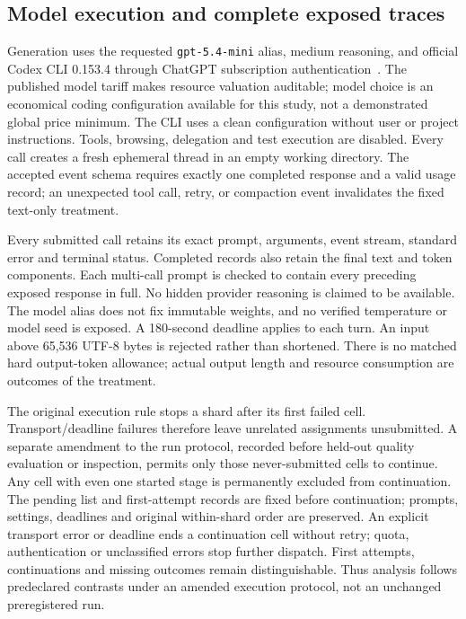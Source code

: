 \subsection{Model execution and complete exposed traces}
Generation uses the requested \texttt{gpt-5.4-mini} alias, medium reasoning, and official Codex CLI 0.153.4 through ChatGPT subscription authentication~\cite{openai54mini2026,codexexec2026}. The published model tariff makes resource valuation auditable; model choice is an economical coding configuration available for this study, not a demonstrated global price minimum. The CLI uses a clean configuration without user or project instructions. Tools, browsing, delegation and test execution are disabled. Every call creates a fresh ephemeral thread in an empty working directory. The accepted event schema requires exactly one completed response and a valid usage record; an unexpected tool call, retry, or compaction event invalidates the fixed text-only treatment.

Every submitted call retains its exact prompt, arguments, event stream, standard error and terminal status. Completed records also retain the final text and token components. Each multi-call prompt is checked to contain every preceding exposed response in full. No hidden provider reasoning is claimed to be available. The model alias does not fix immutable weights, and no verified temperature or model seed is exposed. A 180-second deadline applies to each turn. An input above 65,536 UTF-8 bytes is rejected rather than shortened. There is no matched hard output-token allowance; actual output length and resource consumption are outcomes of the treatment.

The original execution rule stops a shard after its first failed cell. Transport/deadline failures therefore leave unrelated assignments unsubmitted. A separate amendment to the run protocol, recorded before held-out quality evaluation or inspection, permits only those never-submitted cells to continue. Any cell with even one started stage is permanently excluded from continuation. The pending list and first-attempt records are fixed before continuation; prompts, settings, deadlines and original within-shard order are preserved. An explicit transport error or deadline ends a continuation cell without retry; quota, authentication or unclassified errors stop further dispatch. First attempts, continuations and missing outcomes remain distinguishable. Thus analysis follows predeclared contrasts under an amended execution protocol, not an unchanged preregistered run.

